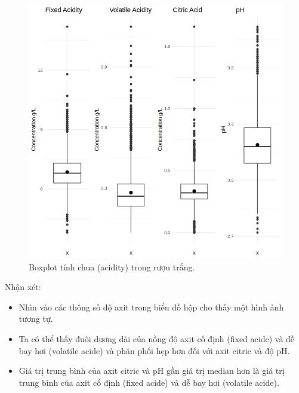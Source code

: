 \begin{figure}[H]
    \centering
    \includegraphics[width=0.75\columnwidth]{wine_figures/white_acidity_boxplot.png}
    \caption{Boxplot tính chua (acidity) trong rượu trắng.}
    \label{fig:white_acidity_boxplot}
\end{figure}
Nhận xét:
\begin{itemize}
    \item Nhìn vào các thông số độ axit trong biểu đồ hộp cho thấy một hình ảnh tương tự. 
    \item Ta có thể thấy đuôi dương dài của nồng độ axit cố định (fixed acide) và dễ bay hơi (volatile acide) và phân phối hẹp hơn đối với axit citric và độ pH. 
    \item Giá trị trung bình của axit citric và pH gần giá trị median hơn là giá trị trung bình của axit cố định (fixed acide) và dễ bay hơi (volatile acide).
\end{itemize}

